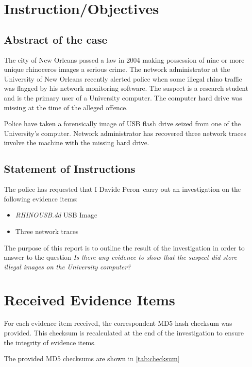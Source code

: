 \documentclass{article}
\newcommand{\writer}{Davide Peron}
\begin{document}
\section{Instruction/Objectives}

\subsection{Abstract of the case}

The city of New Orleans passed a law in 2004 making possession of nine or more unique rhinoceros images a serious crime. The network  administrator at the University of New Orleans recently alerted police when some illegal rhino traffic was flagged by his network monitoring software. The suspect is a research student and is the primary user of a University computer. The computer hard drive was missing at the time of the alleged offence.

Police have taken a forensically image of USB flash drive seized from one of the University's computer.
Network administrator has recovered three network traces involve the machine with the missing hard drive.

\subsection{Statement of Instructions}
The police has requested that I \writer ~carry out an investigation on the following evidence items:

\begin{itemize}
	\item \textit{RHINOUSB.dd} USB Image
	\item Three network traces
\end{itemize}

The purpose of this report is to outline the result of the investigation in order to answer to the question \textit{Is there any evidence to show that the suspect did store illegal images on the University computer?}

\section{Received Evidence Items}

For each evidence item received, the correspondent MD5 hash checksum was provided.
This checksum is recalculated at the end of the investigation to ensure the integrity of evidence items.

The provided MD5 checksums are shown in \autoref{tab:checksum}
\end{document}
